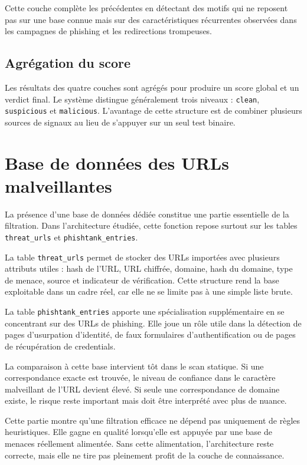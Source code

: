﻿\documentclass[12pt,a4paper]{report}
\begin{document}
Cette couche complète les précédentes en détectant des motifs qui ne reposent pas sur une base connue mais sur des caractéristiques récurrentes observées dans les campagnes de phishing et les redirections trompeuses.

\section{Agrégation du score}

Les résultats des quatre couches sont agrégés pour produire un score global et un verdict final. Le système distingue généralement trois niveaux : \texttt{clean}, \texttt{suspicious} et \texttt{malicious}. L'avantage de cette structure est de combiner plusieurs sources de signaux au lieu de s'appuyer sur un seul test binaire.

\chapter{Base de données des URLs malveillantes}

La présence d'une base de données dédiée constitue une partie essentielle de la filtration. Dans l'architecture étudiée, cette fonction repose surtout sur les tables \texttt{threat\_urls} et \texttt{phishtank\_entries}.

La table \texttt{threat\_urls} permet de stocker des URLs importées avec plusieurs attributs utiles : hash de l'URL, URL chiffrée, domaine, hash du domaine, type de menace, source et indicateur de vérification. Cette structure rend la base exploitable dans un cadre réel, car elle ne se limite pas à une simple liste brute.

La table \texttt{phishtank\_entries} apporte une spécialisation supplémentaire en se concentrant sur des URLs de phishing. Elle joue un rôle utile dans la détection de pages d'usurpation d'identité, de faux formulaires d'authentification ou de pages de récupération de credentials.

La comparaison à cette base intervient tôt dans le scan statique. Si une correspondance exacte est trouvée, le niveau de confiance dans le caractère malveillant de l'URL devient élevé. Si seule une correspondance de domaine existe, le risque reste important mais doit être interprété avec plus de nuance.

Cette partie montre qu'une filtration efficace ne dépend pas uniquement de règles heuristiques. Elle gagne en qualité lorsqu'elle est appuyée par une base de menaces réellement alimentée. Sans cette alimentation, l'architecture reste correcte, mais elle ne tire pas pleinement profit de la couche de connaissance.
\end{document}
